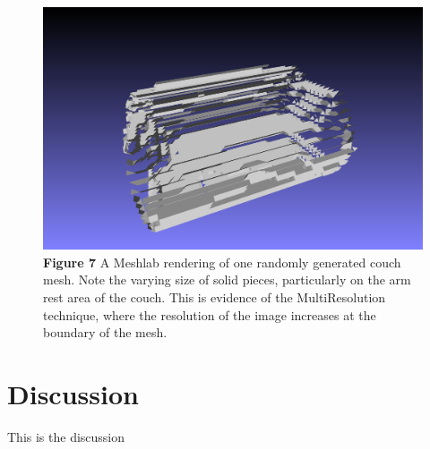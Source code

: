 \documentclass[11pt]{article}
\begin{document}
\begin{figure}[h!]
  \includegraphics[scale=0.4]{./benchImages/couch.png}
  \caption{\hypertarget{fig7}{\textbf{Figure 7}} A Meshlab rendering of one randomly generated couch mesh. Note the varying size of solid pieces, particularly on the arm rest area of the couch. This is evidence of the MultiResolution technique, where the resolution of the image increases at the boundary of the mesh. }

\end{figure}

\newpage 
\section{Discussion}
This is the discussion
\end{document}
